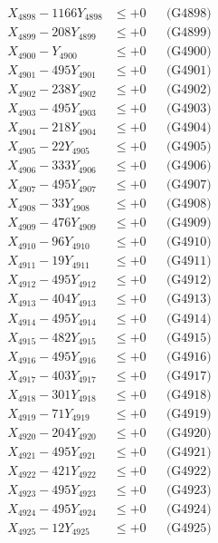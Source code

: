 \documentclass[a4paper,10pt]{article}
\begin{document}
{\begin{align}
X_{4898} - 1166Y_{4898} &\leq +0 && \text{(G4898)} \\
X_{4899} - 208Y_{4899} &\leq +0 && \text{(G4899)} \\
X_{4900} - Y_{4900} &\leq +0 && \text{(G4900)} \\
\allowbreak
X_{4901} - 495Y_{4901} &\leq +0 && \text{(G4901)} \\
X_{4902} - 238Y_{4902} &\leq +0 && \text{(G4902)} \\
X_{4903} - 495Y_{4903} &\leq +0 && \text{(G4903)} \\
X_{4904} - 218Y_{4904} &\leq +0 && \text{(G4904)} \\
X_{4905} - 22Y_{4905} &\leq +0 && \text{(G4905)} \\
X_{4906} - 333Y_{4906} &\leq +0 && \text{(G4906)} \\
X_{4907} - 495Y_{4907} &\leq +0 && \text{(G4907)} \\
X_{4908} - 33Y_{4908} &\leq +0 && \text{(G4908)} \\
X_{4909} - 476Y_{4909} &\leq +0 && \text{(G4909)} \\
X_{4910} - 96Y_{4910} &\leq +0 && \text{(G4910)} \\
\allowbreak
X_{4911} - 19Y_{4911} &\leq +0 && \text{(G4911)} \\
X_{4912} - 495Y_{4912} &\leq +0 && \text{(G4912)} \\
X_{4913} - 404Y_{4913} &\leq +0 && \text{(G4913)} \\
X_{4914} - 495Y_{4914} &\leq +0 && \text{(G4914)} \\
X_{4915} - 482Y_{4915} &\leq +0 && \text{(G4915)} \\
X_{4916} - 495Y_{4916} &\leq +0 && \text{(G4916)} \\
X_{4917} - 403Y_{4917} &\leq +0 && \text{(G4917)} \\
X_{4918} - 301Y_{4918} &\leq +0 && \text{(G4918)} \\
X_{4919} - 71Y_{4919} &\leq +0 && \text{(G4919)} \\
X_{4920} - 204Y_{4920} &\leq +0 && \text{(G4920)} \\
\allowbreak
X_{4921} - 495Y_{4921} &\leq +0 && \text{(G4921)} \\
X_{4922} - 421Y_{4922} &\leq +0 && \text{(G4922)} \\
X_{4923} - 495Y_{4923} &\leq +0 && \text{(G4923)} \\
X_{4924} - 495Y_{4924} &\leq +0 && \text{(G4924)} \\
X_{4925} - 12Y_{4925} &\leq +0 && \text{(G4925)} \\

\end{align}}
\end{document}
